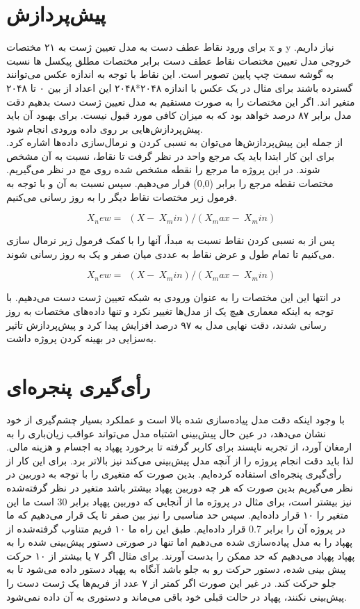 \section{پیش‌پردازش}
برای ورود نقاط عطف دست به مدل تعیین ژست به ۲۱ مختصات x و y نیاز داریم. خروجی مدل تعیین مختصات نقاط عطف دست برابر مختصات مطلق پیکسل ها نسبت به گوشه سمت 
چپ پایین تصویر است. این نقاط با توجه به اندازه عکس می‌توانند گسترده باشند برای مثال در یک عکس با اندازه ۲۰۴۸*۲۰۴۸ این اعداد از بین ۰ تا ۲۰۴۸ متغیر اند. 
اگر این مختصات را به صورت مستقیم به مدل تعیین ژست دست بدهیم دقت مدل برابر ۸۷ درصد خواهد بود که به میزان کافی مورد قبول نیست. برای بهبود آن باید پیش‌پردازش‌هایی بر روی داده ورودی انجام شود. 
\\
از جمله این پیش‌پردازش‌ها می‌توان به نسبی کردن و نرمال‌سازی داده‌ها اشاره کرد. برای این کار ابتدا باید یک مرجع واحد در نظر گرفت تا نقاط، نسبت به آن مشخص شوند. در این پروژه ما مرجع را نقطه 
مشخص شده روی مچ در نظر می‌گیریم. مختصات نقطه مرجع را برابر (0,0)  قرار می‌دهیم. سپس نسبت به آن و با توجه به فرمول زیر مختصات نقاط دیگر را به روز رسانی می‌کنیم.

\begin{equation*}
    X_new=\ \ (X-\ X_min)/(X_max-\ X_min)
\end{equation*}


پس از به نسبی کردن نقاط نسبت به مبدأ، آنها را با کمک فرمول زیر نرمال سازی می‌کنیم تا تمام طول و عرض نقاط به عددی میان صفر و یک به روز رسانی شوند.

\begin{equation*}
    X_new=\ \ (X-\ X_min)/(X_max-\ X_min)
\end{equation*}

در انتها این این مختصات را به عنوان ورودی به شبکه تعیین ژست دست می‌دهیم. با توجه به اینکه معماری هیچ یک از مدل‌ها تغییر نکرد و تنها داده‌های مختصات به روز رسانی شدند، 
دقت نهایی مدل به ۹۷ درصد افزایش پیدا کرد و پیش‌پردازش تاثیر به‌سزایی در بهینه کردن پروژه داشت.


\section{رأی‌گیری پنجره‌ای}
با وجود اینکه دقت مدل پیاده‌سازی شده بالا است و عملکرد بسیار چشم‌گیری از خود نشان می‌دهد، در عین حال پیش‌بینی اشتباه مدل می‌تواند عواقب زیان‌باری را به ارمغان آورد، 
از تجربه ناپسند برای کاربر گرفته تا برخورد پهپاد به اجسام و هزینه مالی. لذا باید دقت انجام پروژه را از آنچه مدل پیش‌بینی می‌کند نیز بالاتر برد. برای این کار از رأی‌گیری پنجره‌ای 
استفاده کرده‌ایم. بدین صورت که متغیری را با توجه به  دوربین در نظر می‌گیریم بدین صورت که هر چه  دوربین پهپاد بیشتر باشد متغیر در نظر گرفته‌شده نیز بیشتر 
است، برای مثال در پروژه ما از آنجایی که دوربین پهپاد برابر 30  است ما این متغیر را ۱۰ قرار داده‌ایم.  سپس حد مناسبی را نیز بین صفر تا یک قرار می‌دهیم که ما در 
پروژه آن را برابر 0.7  قرار داده‌ایم. طبق این راه ما ۱۰ فریم متناوب گرفته‌شده از پهپاد را به مدل پیاده‌سازی شده می‌دهیم اما تنها در صورتی دستور پیش‌بینی شده را به پهپاد
پهپاد می‌دهیم که حد ممکن را بدست آورند. برای مثال اگر ۷ یا بیشتر از ۱۰ حرکت پیش بینی شده، دستور حرکت رو به جلو باشد آنگاه به پهپاد دستور داده می‌شود تا به جلو حرکت کند. 
در غیر این صورت اگر کمتر از ۷ عدد از فریم‌ها یک ژست دست را پیش‌بینی نکنند، پهپاد در حالت قبلی خود باقی می‌ماند و دستوری به آن داده نمی‌شود.
